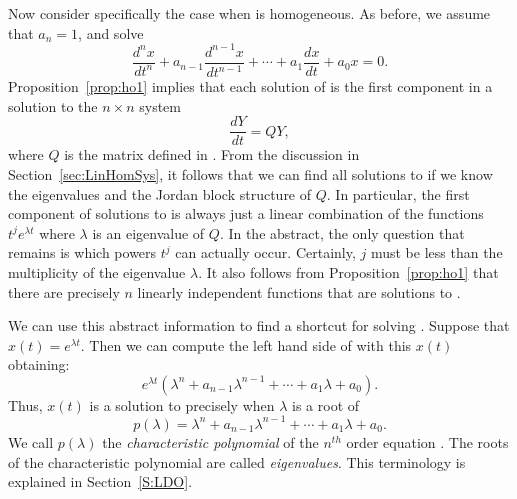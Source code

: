 Now consider specifically the case when  is homogeneous.  
As before, we assume that $a_n=1$, and solve
\begin{equation}  \label{eq:nconsthom}
\frac{d^nx}{dt^n} + a_{n-1}\frac{d^{n-1}x}{dt^{n-1}} +
\cdots + a_1\frac{dx}{dt}+a_0x = 0.
\end{equation}
Proposition~\ref{prop:ho1} implies that each solution
of  is the first component in a solution
to the $n\times n$ system 
\begin{equation}  \label{eq:highrwh}
\frac{dY}{dt} = QY,
\end{equation}
where $Q$ is the matrix defined in .  From the discussion 
in Section~\ref{sec:LinHomSys}, it follows that we can find all solutions 
to  if we know the eigenvalues and the 
Jordan block 
structure of $Q$.  In particular, the first component of solutions to 
 is always just a linear combination of the 
functions 
$t^je^{\lambda t}$ where $\lambda$ is an eigenvalue of $Q$.  In the 
abstract, the only question that remains is which powers $t^j$ can 
actually occur.  Certainly, $j$ must be less than the multiplicity of the 
eigenvalue $\lambda$.  It also follows from Proposition~\ref{prop:ho1}
that there are precisely $n$ linearly independent functions that are 
solutions to .

We can use this abstract information to find a shortcut for solving 
.  Suppose that $x(t)=e^{\lambda t}$.  Then we can 
compute the left hand side of  with this $x(t)$ 
obtaining:
\begin{equation}  \label{e:elam}
e^{\lambda t}\left(\lambda^n + a_{n-1}\lambda^{n-1}+\cdots+a_1\lambda
+a_0\right).
\end{equation}
Thus, $x(t)$ is a solution to  precisely when $\lambda$
is a root of 
\begin{equation} \label{E:charpoly}
p(\lambda) = \lambda^n + a_{n-1}\lambda^{n-1}+\cdots+a_1\lambda +a_0.
\end{equation}
We call $p(\lambda)$ the {\em characteristic polynomial\/}
 of the $n^{th}$ 
order equation .  The roots of the characteristic polynomial
are called {\em eigenvalues\/}.   
This terminology is explained in Section~\ref{S:LDO}.
 
